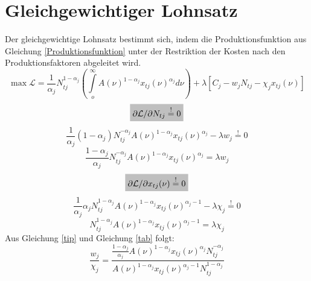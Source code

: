 \section{Gleichgewichtiger Lohnsatz}\label{sec:Appendix-Lohnsatz}
Der gleichgewichtige Lohnsatz bestimmt sich, indem die Produktionsfunktion aus Gleichung \eqref{Produktionsfunktion} unter der Restriktion der Kosten nach den Produktionsfaktoren abgeleitet wird.
\begin{equation*}
\max{\mathcal{L}}=\frac{1}{\alpha_j}N_{tj}^{1-\alpha_j}\left(\int\limits_{o}^\infty{A(\nu)^{1-\alpha_j}x_{tj}(\nu)^{\alpha_j}d\nu}\right)+\lambda\left[C_j-w_jN_{tj}-\chi_{j}x_{tj}(\nu)\right]
\end{equation*} 
\begin{equation*}
\colorbox{lightgray}{$\partial \mathcal{L}/\partial N_{tj} \overset{!}{=} 0$}
\end{equation*}
\begin{equation*}
\frac{1}{\alpha_j}(1-\alpha_j)N_{tj}^{-\alpha_j}A(\nu)^{1-\alpha_j}x_{tj}(\nu)^{\alpha_j}-\lambda w_j \overset{!}{=} 0
\end{equation*}
\begin{equation}
\frac{1-\alpha_j}{\alpha_j}N_{tj}^{-\alpha_j}A(\nu)^{1-\alpha_j}x_{tj}(\nu)^{\alpha_j}=\lambda w_j\label{tip}
\end{equation}
\begin{equation*}
\colorbox{lightgray}{$\partial \mathcal{L}/\partial x_{tj}(\nu) \overset{!}{=} 0$}
\end{equation*}
\begin{equation*}
\frac{1}{\alpha_j}\alpha_jN_{tj}^{1-\alpha_j}A(\nu)^{1-\alpha_j}x_{tj}(\nu)^{\alpha_j-1}-\lambda \chi_j \overset{!}{=} 0
\end{equation*}
\vspace{-0.4cm}
\begin{equation}
N_{tj}^{1-\alpha_j}A(\nu)^{1-\alpha_j}x_{tj}(\nu)^{\alpha_j-1}=\lambda \chi_j\label{tab}
\end{equation}
Aus Gleichung \eqref{tip} und Gleichung \eqref{tab} folgt:
\begin{equation}
\frac{w_j}{\chi_j}=\frac{\frac{1-\alpha_j}{\alpha_j}A(\nu)^{1-\alpha_j}x_{tj}(\nu)^{\alpha_j} N_{tj}^{-\alpha_j}}{A(\nu)^{1-\alpha_j}x_{tj}(\nu)^{\alpha_j-1}N_{tj}^{1-\alpha_j}}
\end{equation}
